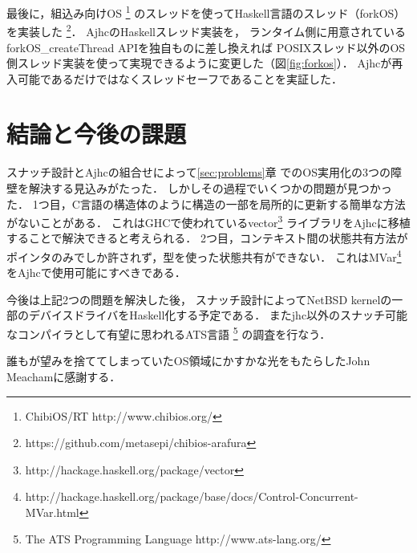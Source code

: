 \documentclass[submit,techreq,noauthor]{ipsj}
\begin{document}
最後に，組込み向けOS
\footnote{ChibiOS/RT http://www.chibios.org/}
のスレッドを使ってHaskell言語のスレッド（forkOS）を実装した
\footnote{https://github.com/metasepi/chibios-arafura}．
AjhcのHaskellスレッド実装を，
ランタイム側に用意されているforkOS\_createThread APIを独自ものに差し換えれば
POSIXスレッド以外のOS側スレッド実装を使って実現できるように変更した（図\ref{fig:forkos}）．
Ajhcが再入可能であるだけではなくスレッドセーフであることを実証した．

\section{結論と今後の課題}

スナッチ設計とAjhcの組合せによって\ref{sec:problems}章
でのOS実用化の3つの障壁を解決する見込みがたった．
しかしその過程でいくつかの問題が見つかった．
1つ目，C言語の構造体のように構造の一部を局所的に更新する簡単な方法がないことがある．
これはGHCで使われているvector\footnote{http://hackage.haskell.org/package/vector}
ライブラリをAjhcに移植することで解決できると考えられる．
2つ目，コンテキスト間の状態共有方法がポインタのみでしか許されず，型を使った状態共有ができない．
これはMVar\footnote{http://hackage.haskell.org/package/base/docs/Control-Concurrent-MVar.html}
をAjhcで使用可能にすべきである．

今後は上記2つの問題を解決した後，
スナッチ設計によってNetBSD kernelの一部のデバイスドライバをHaskell化する予定である．
またjhc以外のスナッチ可能なコンパイラとして有望に思われるATS言語
\footnote{The ATS Programming Language http://www.ats-lang.org/}
の調査を行なう．

\begin{acknowledgment}
誰もが望みを捨ててしまっていたOS領域にかすかな光をもたらしたJohn Meachamに感謝する．
\end{acknowledgment}



\end{document}
